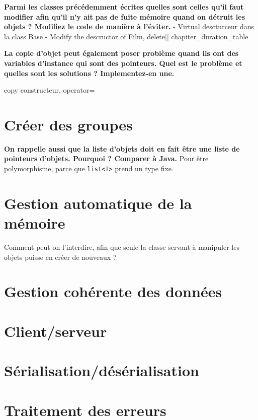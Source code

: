 \documentclass[a4paper]{article}
\begin{document}
\textbf{Parmi les classes précédemment écrites quelles sont celles qu'il faut
modifier afin qu'il n'y ait pas de fuite mémoire quand on détruit les objets ?
Modifiez le code de manière à l'éviter.}
- Virtual descturceur dans la class Base
- Modify the descructor of Film, delete[] chapiter_duration_table




\textbf{La copie d'objet peut également poser problème quand ils ont des variables
d'instance qui sont des pointeurs. Quel est le problème et quelles sont les
solutions ? Implementez-en une. } 

copy constructeur, operator=

\section{Créer des groupes}
\textbf{On rappelle aussi que la liste d'objets doit en fait être une liste de
pointeurs d'objets. Pourquoi ? Comparer à Java.}
Pour être polymorphisme, parce que \texttt{list<T>} prend un type fixe. 





\section{Gestion automatique de la mémoire}
Comment peut-on l'interdire, afin que seule la classe servant à manipuler les
objets puisse en créer de nouveaux ? 
\section{Gestion cohérente des données}
\section{Client/serveur}
\section{Sérialisation/désérialisation}
\section{Traitement des erreurs}






    



\end{document}
